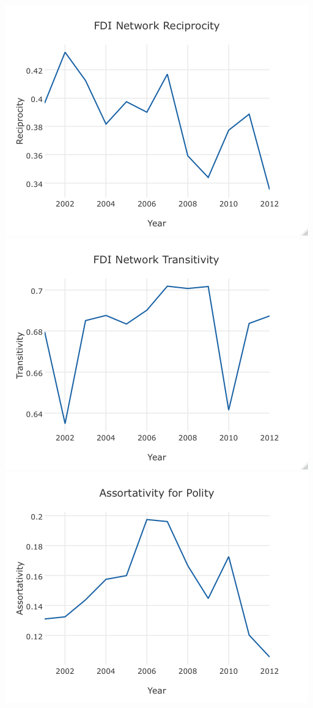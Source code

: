 \documentclass{article}
\begin{document}
\includegraphics[scale=.8]{draft_figures/reciprocity.png}\\
\includegraphics[scale=.8]{draft_figures/transitivity.png}\\
\includegraphics[scale=.8]{draft_figures/assortativity.png}\\
\end{document}
